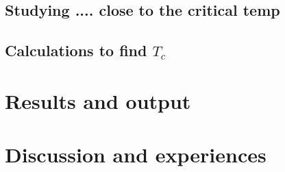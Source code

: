\documentclass[11pt,a4wide]{article}
\begin{document}
\subsection{Studying .... close to the critical temp}


\subsection{Calculations to find $T_c$}


\section{Results and output}


\section{Discussion and experiences}





\newpage
\end{document}
